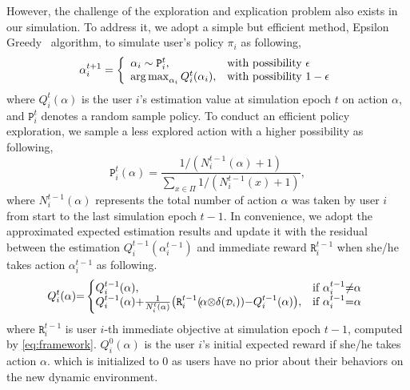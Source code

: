 However, the challenge of the exploration and explication problem also exists in our simulation. 
To address it, we adopt a simple but efficient method, Epsilon Greedy~\cite{sutton2018reinforcement} algorithm, to simulate user's policy $\pi_i$ as following, %
\begin{equation}
     \alpha_i^{t+1} = \left\{
\begin{array}{l l }
\alpha_i \sim \texttt{P}^t_i,
& \text{with possibility } \epsilon \\
\operatorname*{arg\,max}_{\alpha_i} Q_i^t(\alpha_i), & \text{with possibility }  1-\epsilon \\
\end{array} \right. 
    \label{epsilon_greedy}
\end{equation}
where $Q_i^t(\alpha)$ is the user $i$'s estimation value at simulation epoch $t$ on action $\alpha$, and $\texttt{P}^t_i$ denotes a random sample policy.
To conduct an efficient policy exploration, we sample a less explored action with a higher possibility as following,
\begin{equation}
    \texttt{P}^t_i(\alpha) = \frac{ 1/ (N^{t-1}_i(\alpha) +1) } { \sum_{x \in \Pi} 1/(N^{t-1}_i(x) +1) },
    \label{random_rule}
\end{equation}
where $N^{t-1}_i(\alpha)$ represents the total number of action $\alpha$ was taken by user $i$ from start to the last simulation epoch $t{-}1$.
In convenience, we adopt the approximated expected estimation results and 
update it with the residual between the estimation $Q_i^{t-1}(\alpha_i^{t-1})$ and immediate reward  $\texttt{R}_i^{t-1}$ when she/he takes action $\alpha_i^{t-1}$ as following.
\begin{equation*}
       Q_i^t(\alpha) {=} \left\{\!\!\!
\begin{array}{l l}
Q_i^{t-1}(\alpha), &  \text{if } \alpha_i^{t-1} {\neq} \alpha \\
Q_i^{t{-}1}(\alpha) {+} \frac{1}{N^t_i(\alpha)} \bigl(\texttt{R}_i^{t-1}(\! \alpha {\otimes} \mathrm{\delta}({\scriptstyle \mathcal{D}_i})  ) {-} Q_i^{t{-}1}(\alpha) \bigr), &  \text{if }  \alpha_i^{t{-}1} {=} \alpha \\
\end{array} \right. 
\end{equation*}
where $\texttt{R}_i^{t-1}$ is user $i$-th immediate objective at simulation epoch $t{-}1$, computed by \cref{eq:framework}. 
$Q_i^0(\alpha) $ is the user $i$'s initial expected reward if she/he takes action $\alpha$. 
which is initialized to $0$ as users have no prior about their behaviors on the new dynamic environment.


